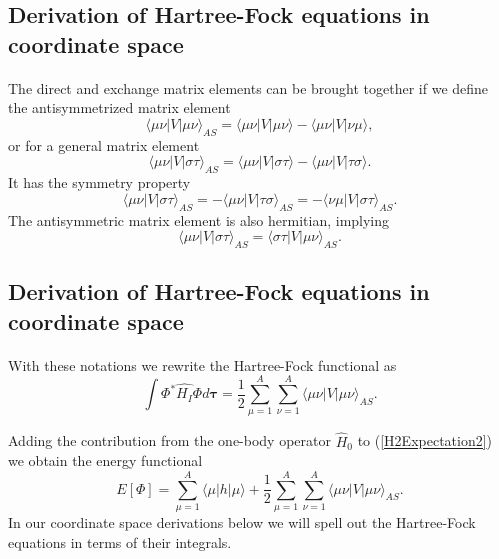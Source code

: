 \documentclass[%
twoside,                 %
final,                   %
10pt]{article}
\begin{document}
\subsection*{Derivation of Hartree-Fock equations in coordinate space}

\paragraph{}
The direct and exchange matrix elements can be  brought together if we define the antisymmetrized matrix element
\[
\langle \mu\nu|V|\mu\nu\rangle_{AS}= \langle \mu\nu|V|\mu\nu\rangle-\langle \mu\nu|V|\nu\mu\rangle,
\]
or for a general matrix element  
\[
\langle \mu\nu|V|\sigma\tau\rangle_{AS}= \langle \mu\nu|V|\sigma\tau\rangle-\langle \mu\nu|V|\tau\sigma\rangle.
\]
It has the symmetry property
\[
\langle \mu\nu|V|\sigma\tau\rangle_{AS}= -\langle \mu\nu|V|\tau\sigma\rangle_{AS}=-\langle \nu\mu|V|\sigma\tau\rangle_{AS}.
\]
The antisymmetric matrix element is also hermitian, implying 
\[
\langle \mu\nu|V|\sigma\tau\rangle_{AS}= \langle \sigma\tau|V|\mu\nu\rangle_{AS}.
\]



\subsection*{Derivation of Hartree-Fock equations in coordinate space}

\paragraph{}
With these notations we rewrite the Hartree-Fock functional as
\begin{equation}
  \int \Phi^*\hat{H_I}\Phi d\mathbf{\tau} 
  = \frac{1}{2}\sum_{\mu=1}^A\sum_{\nu=1}^A \langle \mu\nu|V|\mu\nu\rangle_{AS}. \label{H2Expectation2}
\end{equation}

Adding the contribution from the one-body operator $\hat{H}_0$ to
(\ref{H2Expectation2}) we obtain the energy functional 
\begin{equation}
  E[\Phi] 
  = \sum_{\mu=1}^A \langle \mu | h | \mu \rangle +
  \frac{1}{2}\sum_{{\mu}=1}^A\sum_{{\nu}=1}^A \langle \mu\nu|V|\mu\nu\rangle_{AS}. \label{FunctionalEPhi}
\end{equation}
In our coordinate space derivations below we will spell out the Hartree-Fock equations in terms of their integrals.
\end{document}

